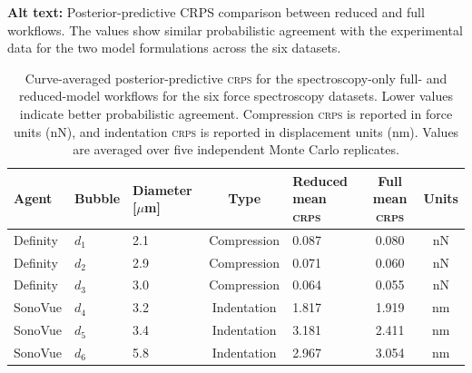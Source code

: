 \documentclass[%
 aip,
 jcp,
 amsmath,amssymb,
 preprint,%
]{revtex4-1}
\begin{document}
\begin{table}[!htbp]
\caption{\label{tab:crps_trusted}
Curve-averaged posterior-predictive \textsc{crps} for the spectroscopy-only full- and reduced-model workflows for the six force spectroscopy datasets. Lower values indicate better probabilistic agreement.
Compression \textsc{crps} is reported in force units (nN), and
indentation \textsc{crps} is reported in displacement units (nm).
Values are averaged over five independent Monte Carlo replicates.}
\noindent\textbf{Alt text:} Posterior-predictive CRPS comparison between reduced and full workflows. The values show similar probabilistic agreement with the experimental data for the two model formulations across the six datasets.
\par\vspace{0.75\baselineskip}
\begin{ruledtabular}
\begin{tabular}{lllclcc}
Agent & Bubble & Diameter [$\mu$m] & Type & Reduced mean \textsc{crps} &
Full mean \textsc{crps} & Units \\
\hline
Definity & $d_1$ & 2.1 & Compression & 0.087 & 0.080 & nN \\
Definity & $d_2$ & 2.9 & Compression & 0.071 & 0.060 & nN \\
Definity & $d_3$ & 3.0 & Compression & 0.064 & 0.055 & nN \\
\hline
SonoVue & $d_4$ & 3.2 & Indentation & 1.817 & 1.919 & nm \\
SonoVue & $d_5$ & 3.4 & Indentation & 3.181 & 2.411 & nm \\
SonoVue & $d_6$ & 5.8 & Indentation & 2.967 & 3.054 & nm \\
\end{tabular}
\end{ruledtabular}
\end{table}
\end{document}
